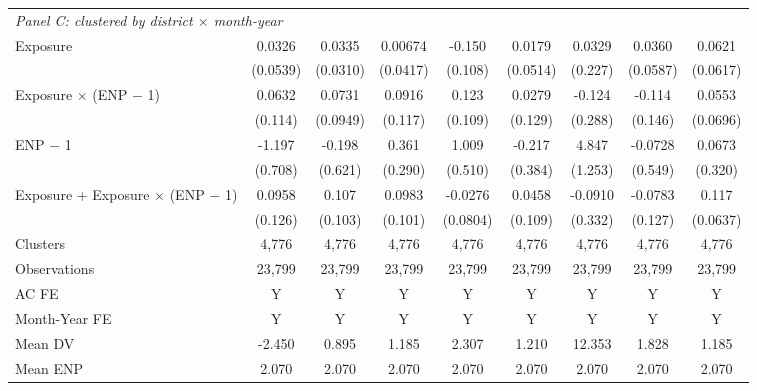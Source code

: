 {\begin{tabular}{l*{8}{c}}
\multicolumn{9}{l}{\textit{Panel C: clustered by district $\times$ month-year}} \\
Exposure    &      0.0326         &      0.0335         &     0.00674         &      -0.150         &      0.0179         &      0.0329         &      0.0360         &      0.0621         \\
            &    (0.0539)         &    (0.0310)         &    (0.0417)         &     (0.108)         &    (0.0514)         &     (0.227)         &    (0.0587)         &    (0.0617)         \\
Exposure $\times$ (ENP $-$ 1)&      0.0632         &      0.0731         &      0.0916         &       0.123         &      0.0279         &      -0.124         &      -0.114         &      0.0553         \\
            &     (0.114)         &    (0.0949)         &     (0.117)         &     (0.109)         &     (0.129)         &     (0.288)         &     (0.146)         &    (0.0696)         \\
ENP $-$ 1   &      -1.197\sym{*}  &      -0.198         &       0.361         &       1.009\sym{**} &      -0.217         &       4.847\sym{***}&     -0.0728         &      0.0673         \\
            &     (0.708)         &     (0.621)         &     (0.290)         &     (0.510)         &     (0.384)         &     (1.253)         &     (0.549)         &     (0.320)         \\

Exposure + Exposure $\times$ (ENP $-$ 1)&      0.0958         &       0.107         &      0.0983         &     -0.0276         &      0.0458         &     -0.0910         &     -0.0783         &0.117\sym{*}         \\
            &     (0.126)         &     (0.103)         &     (0.101)         &    (0.0804)         &     (0.109)         &     (0.332)         &     (0.127)         &    (0.0637)         \\
Clusters    &       4,776         &       4,776         &       4,776         &       4,776         &       4,776         &       4,776         &       4,776         &       4,776         \\
\midrule



Observations&      23,799&      23,799&      23,799&      23,799&      23,799&      23,799&      23,799&      23,799\\
AC FE       &           Y&           Y&           Y&           Y&           Y&           Y&           Y&           Y\\
Month-Year FE&           Y&           Y&           Y&           Y&           Y&           Y&           Y&           Y\\
Mean DV     &      -2.450&       0.895&       1.185&       2.307&       1.210&      12.353&       1.828&       1.185\\
Mean ENP    &       2.070&       2.070&       2.070&       2.070&       2.070&       2.070&       2.070&       2.070\\
\bottomrule
\end{tabular}
}
